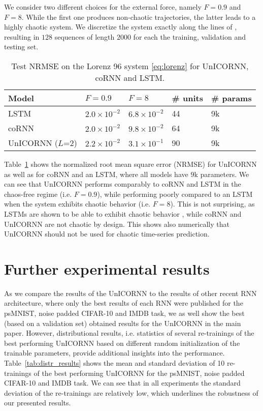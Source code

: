 \documentclass{article}
\newcommand{\Tref}[1]{Table~\ref{#1}}
\begin{document}
We consider two different choices for the external force, namely $F=0.9$ and $F=8$. While the first one produces non-chaotic trajectories, the latter leads to a highly chaotic system. We discretize the system exactly along the lines of \cite{coRNN}, resulting in $128$ sequences of length $2000$ for each the training, validation and testing set.
\begin{table}[h!]
  \caption{Test NRMSE on the Lorenz 96 system \eqref{eq:lorenz} for UnICORNN, coRNN and LSTM.}
  \label{tab:lorenz}
  \centering
  \begin{tabular}{lllll}
    \toprule
    \cmidrule(r){1-5}
    Model & $F=0.9$ & $F=8$ & \# units & \# params \\
        \midrule
    LSTM \cite{coRNN} & $2.0\times 10^{-2}$& $6.8\times 10^{-2}$ & 44 & 9k\\
    coRNN \cite{coRNN} & $2.0\times 10^{-2}$ & $9.8\times 10^{-2}$ & 64 & 9k\\
    UnICORNN ($L$=$2$) & $2.2\times 10^{-2}$ & $3.1\times 10^{-1}$ & 90 & 9k\\
    \bottomrule
  \end{tabular}
\end{table}
\Tref{tab:lorenz} shows the normalized root mean square error (NRMSE) for UnICORNN as well as for coRNN and an LSTM, where all models have $9$k parameters. We can see that UnICORNN performs comparably to coRNN and LSTM in the chaos-free regime (i.e. $F=0.9$), while performing poorly compared to an LSTM when the system exhibits chaotic behavior (i.e. $F=8$). This is not surprising, as LSTMs are shown to be able to exhibit chaotic behavior \citep{chaotic_lstm}, while coRNN and UnICORNN are not chaotic by design.
This shows also numerically that UnICORNN should not be used for chaotic time-series prediction.

\section{Further experimental results}
As we compare the results of the UnICORNN to the results of other recent RNN architecture, where only the best results of each RNN were published for the psMNIST, noise padded CIFAR-10 and IMDB task, we as well show the best (based on a validation set) obtained results for the UnICORNN in the main paper. However, distributional results, i.e. statistics of several re-trainings of the best performing UnICORNN based on different random initialization of the trainable parameters, provide additional insights into the performance. \Tref{tab:distr_results} shows the mean and standard deviation of 10 re-trainings of the best performing UnICORNN for the psMNIST, noise padded CIFAR-10 and IMDB task. We can see that in all experiments the standard deviation of the re-trainings are relatively low, which underlines the robustness of our presented results. 
\end{document}
